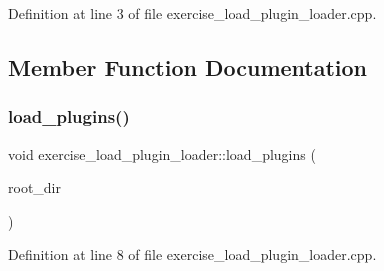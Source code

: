 Definition at line 3 of file exercise\+\_\+load\+\_\+plugin\+\_\+loader.\+cpp.



\subsection{Member Function Documentation}
\mbox{\label{classexercise__load__plugin__loader_a1a388b6c581a2fb5870f16913181284e}} 
\subsubsection{\texorpdfstring{load\+\_\+plugins()}{load\_plugins()}}
{\footnotesize\ttfamily void exercise\+\_\+load\+\_\+plugin\+\_\+loader\+::load\+\_\+plugins (\begin{DoxyParamCaption}\item[{Q\+Dir}]{root\+\_\+dir }\end{DoxyParamCaption})}



Definition at line 8 of file exercise\+\_\+load\+\_\+plugin\+\_\+loader.\+cpp.

